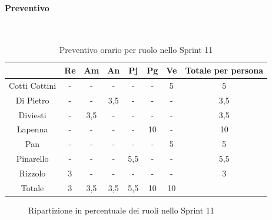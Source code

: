 \documentclass{article}
\begin{document}
                \paragraph{Preventivo}\mbox{}\\
                \begin{table}[H]
                    \centering
                    \begin{tabular}{|c|c|c|c|c|c|c|c|}
                    \hline
                                  & Re  & Am  & An  & Pj  & Pg  & Ve  & Totale per persona \\ \hline
                    Cotti Cottini & -   & -   & -   & -   & -   & 5   & 5                  \\ \hline
                    Di Pietro     & -   & -   & 3,5 & -   & -   & -   & 3,5                \\ \hline
                    Diviesti      & -   & 3,5 & -   & -   & -   & -   & 3,5                \\ \hline
                    Lapenna       & -   & -   & -   & -   & 10  & -   & 10                 \\ \hline
                    Pan           & -   & -   & -   & -   & -   & 5   & 5                  \\ \hline
                    Pinarello     & -   & -   & -   & 5,5 & -   & -   & 5,5                \\ \hline
                    Rizzolo       & 3   & -   & -   & -   & -   & -   & 3                  \\ \hline
                    Totale        & 3   & 3,5 & 3,5 & 5,5 & 10  & 10  &                    \\ \hline
                    \end{tabular}
                    \caption{Preventivo orario per ruolo nello Sprint 11}
                \end{table}


                \begin{figure}[H]
                    \centering
                    \caption{Ripartizione in percentuale dei ruoli nello Sprint 11}
                \end{figure}


\end{document}
